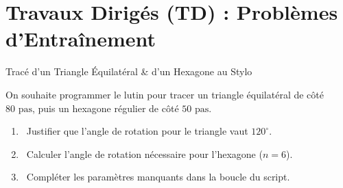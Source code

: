 \section{Travaux Dirigés (TD) : Problèmes d'Entraînement}

\begin{exercice}[3 pts][\capRealiser]{Tracé d'un Triangle Équilatéral \& d'un Hexagone au Stylo}
\noindent
\begin{minipage}[c]{0.58\linewidth}
On souhaite programmer le lutin pour tracer un triangle équilatéral de côté $80\text{ pas}$, puis un hexagone régulier de côté $50\text{ pas}$.
\begin{enumerate}[leftmargin=1.2em, itemsep=1pt]
    \item \capRealiser\ Justifier que l'angle de rotation pour le triangle vaut $120^\circ$.
    \item \capRealiser\ Calculer l'angle de rotation nécessaire pour l'hexagone ($n = 6$).
    \item \capValider\ Compléter les paramètres manquants dans la boucle du script.
\end{enumerate}
\end{minipage}\hfill
\begin{minipage}[c]{0.38\linewidth}
\centering
{}
\end{minipage}

\vspace{1mm}
\lignesreponse[2]
\end{exercice}

